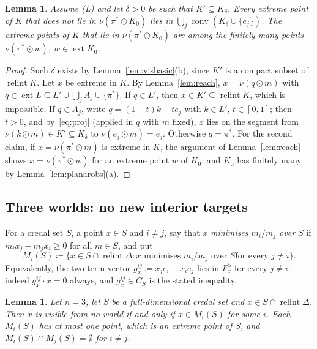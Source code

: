 \documentclass[11pt]{article}
\DeclareMathOperator{\conv}{conv}
\DeclareMathOperator{\relint}{relint}
\DeclareMathOperator{\ext}{ext}
\theoremstyle{plain}
\newtheorem{lemma}[theorem]{Lemma}
\theoremstyle{definition}
\theoremstyle{remark}
\begin{document}
\begin{lemma}\label{lem:U}
Assume (L) and let $\delta>0$ be such that $K'\subseteq K_\delta$. Every extreme point of
$K$ that does not lie in $\nu(\pi^\ast\odot K_0)$ lies in $\bigcup_j\conv(K_\delta\cup
\{e_j\})$. The extreme points of $K$ that lie in $\nu(\pi^\ast\odot K_0)$ are among the
finitely many points $\nu(\pi^\ast\odot w)$, $w\in\ext K_0$.
\end{lemma}

\begin{proof}
Such $\delta$ exists by Lemma~\ref{lem:visbasic}(b), since $K'$ is a compact subset of
$\relint K$. Let $x$ be extreme in $K$. By Lemma~\ref{lem:reach}, $x=\nu(q\odot m)$ with
$q\in\ext L\subseteq L'\cup\bigcup_jA_j\cup\{\pi^\ast\}$. If $q\in L'$, then $x\in
K'\subseteq\relint K$, which is impossible. If $q\in A_j$, write $q=(1-t)k+te_j$ with $k\in
L'$, $t\in[0,1]$; then $t>0$, and by~\eqref{eq:proj} (applied in $q$ with $m$ fixed), $x$
lies on the segment from $\nu(k\odot m)\in K'\subseteq K_\delta$ to $\nu(e_j\odot m)=e_j$.
Otherwise $q=\pi^\ast$. For the second claim, if $x=\nu(\pi^\ast\odot m)$ is extreme in $K$,
the argument of Lemma~\ref{lem:reach} shows $x=\nu(\pi^\ast\odot w)$ for an extreme point
$w$ of $K_0$, and $K_0$ has finitely many by Lemma~\ref{lem:planarobs}(a).
\end{proof}

\subsection{Three worlds: no new interior targets}

For a credal set $S$, a point $x\in S$ and $i\ne j$, say that $x$ \emph{minimises $m_i/m_j$
over $S$} if $m_ix_j-m_jx_i\ge0$ for all $m\in S$, and put
\[
  M_i(S)\coloneqq\{x\in S\cap\relint\Delta:x\text{ minimises }m_i/m_j\text{ over }S\text{
  for every }j\ne i\}.
\]
Equivalently, the two-term vector $g^{ij}_x\coloneqq x_je_i-x_ie_j$ lies in $F^S_x$ for
every $j\ne i$: indeed $g^{ij}_x\cdot x=0$ always, and $g^{ij}_x\in C_S$ is the stated
inequality.

\begin{lemma}\label{lem:N3}
Let $n=3$, let $S$ be a full-dimensional credal set and $x\in S\cap\relint\Delta$. Then $x$
is visible from no world if and only if $x\in M_i(S)$ for some $i$. Each $M_i(S)$ has at
most one point, which is an extreme point of $S$, and $M_i(S)\cap M_j(S)=\emptyset$ for
$i\ne j$.
\end{lemma}
\end{document}
